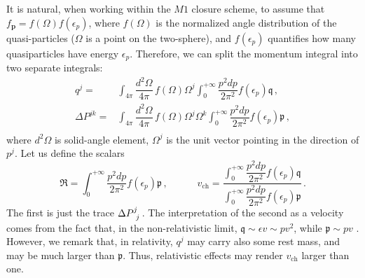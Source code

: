 \documentclass[a4paper, amsfonts, amssymb, amsmath, reprint, showkeys, nofootinbib, twoside, onecolumn, notitlepage]{revtex4-1}
\newcommand{\spc}{\quad \quad \quad}
\begin{document}
It is natural, when working within the $M1$ closure scheme, to assume that $f_{\textbf{p}}=f(\Omega)f(\epsilon_p)$, where $f(\Omega)$ is the normalized angle distribution of the quasi-particles ($\Omega$ is a point on the two-sphere), and $f(\epsilon_p)$ quantifies how many quasiparticles have energy $\epsilon_p$. Therefore, we can split the momentum integral into two separate integrals:
\begin{equation}
\begin{split}
q^j={}&  \int_{4\pi} \dfrac{d^2\Omega}{4\pi} \,  f(\Omega)\Omega^j \int_0^{+\infty} \dfrac{p^2 dp}{2\pi^2} f(\epsilon_p) \mathfrak{q} \, ,\\
\Delta P^{jk} ={}& \int_{4\pi} \dfrac{d^2\Omega}{4\pi} \, f(\Omega)\Omega^j \Omega^k   \int_0^{+\infty} \dfrac{p^2 dp}{2\pi^2} f(\epsilon_p) \mathfrak{p}  \, , \\
\end{split}
\end{equation}
where $d^2\Omega$ is solid-angle element, $\Omega^j$ is the unit vector pointing in the direction of $p^j$. Let us define the scalars
\begin{equation}\label{rererrresbuf}
    \mathfrak{R}= \int_0^{+\infty} \dfrac{p^2 dp}{2\pi^2} f(\epsilon_p) \mathfrak{p} \, , \spc v_{\text{ch}}= \dfrac{\displaystyle\int_0^{+\infty} \dfrac{p^2 dp}{2\pi^2} f(\epsilon_p) \mathfrak{q} }{\displaystyle\int_0^{+\infty} \dfrac{p^2 dp}{2\pi^2} f(\epsilon_p) \mathfrak{p}} \, .
\end{equation}
The first is just the trace $\Delta P\indices{^j _j}$. The interpretation of the second as a velocity comes from the fact that, in the non-relativistic limit, $\mathfrak{q} \sim \epsilon v \sim p v^2$, while $\mathfrak{p} \sim pv$ \cite{landau10}. However, we remark that, in relativity, $q^j$ may carry also some rest mass, and may be much larger than $\mathfrak{p}$. Thus, relativistic effects may render $v_{\text{ch}}$ larger than one.
\end{document}
